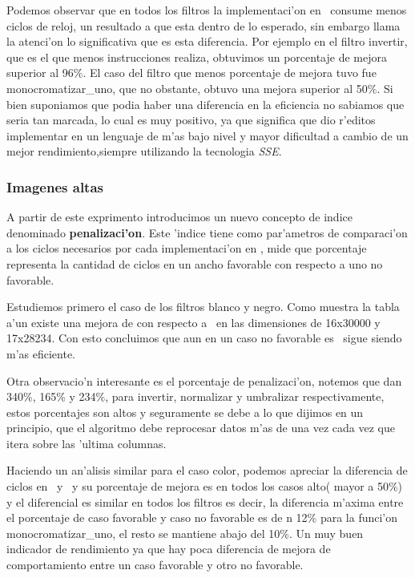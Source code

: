 Podemos observar que en todos los filtros 
la implementaci'on en \ass \ consume
menos ciclos de reloj, un resultado a que esta dentro de lo esperado, sin embargo llama la atenci'on
lo significativa que es esta diferencia. Por ejemplo en el filtro invertir, que es el que menos instrucciones
realiza, obtuvimos un porcentaje de mejora superior al 96$\%$. El caso del filtro que menos porcentaje
de mejora tuvo fue monocromatizar_uno, que no obstante, obtuvo una mejora superior al 50$\%$. Si bien
suponiamos que podia haber una diferencia en la eficiencia no sabiamos que seria tan marcada, lo cual es muy 
positivo, ya que significa que dio r'editos implementar en un lenguaje de m'as bajo nivel y mayor dificultad
 a cambio de un mejor rendimiento,siempre utilizando la tecnologia \textit{SSE}.\\

\subsubsection{Imagenes altas}
A partir de este exprimento introducimos un nuevo concepto de indice denominado
\textbf{penalizaci'on}. Este 'indice tiene como par'ametros de comparaci'on a los ciclos necesarios por
cada implementaci'on en \ass, mide que porcentaje representa la cantidad de ciclos en un ancho 
favorable con respecto a uno no favorable.

Estudiemos primero el caso de los filtros blanco y negro. Como muestra la tabla a'un existe una 
mejora de \ass  con respecto a \C \  en las dimensiones de 16x30000 y 17x28234. Con esto concluimos que aun
en un caso no favorable es \ass \ sigue siendo m'as eficiente.

Otra observacio'n interesante es el porcentaje de penalizaci'on, notemos que dan 340\%, 165\% y
234\%, para invertir, normalizar y umbralizar respectivamente, estos porcentajes son altos 
y seguramente se debe a lo que dijimos en un principio, que el algoritmo debe reprocesar datos m'as de 
una vez cada vez que itera sobre las 'ultima columnas.

Haciendo un an'alisis similar para el caso color, 
podemos apreciar la diferencia de ciclos en \C \ y \ass \ y su porcentaje de mejora es en todos los casos
alto( mayor a 50\%) y el diferencial es similar en todos los filtros es decir,
la diferencia m'axima entre el porcentaje de caso favorable y caso no favorable es de n 12\% para la funci'on monocromatizar_uno,
el resto se mantiene abajo del 10\%. Un muy buen indicador de rendimiento ya que hay poca diferencia de mejora de
comportamiento entre un caso favorable y otro no favorable.

